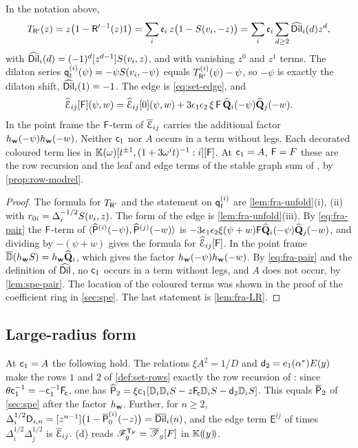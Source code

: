 \begin{thm}[Dictionary]
\label{thm:fra-dict}
In the notation above,
\[
T_{\mathsf{R}'}(z)=z\big(1-\mathsf{R}'^{-1}(z)1\big)=\sum_i\mathfrak{e}_i\,z\big(1-S(v_i,-z)\big)=\sum_i\mathfrak{e}_i\sum_{d\geq2}\widehat{\mathsf{Dil}}_i(d)z^d,
\]
with $\widehat{\mathsf{Dil}}_i(d)=(-1)^d[z^{d-1}]S(v_i,z)$, and with vanishing $z^0$ and $z^1$ terms. The dilaton series $\mathsf{q}_{t}^{(i)}(\psi)=-\psi S(v_i,-\psi)$ equals $T_{\mathsf{R}'}^{(i)}(\psi)-\psi$, so $-\psi$ is exactly the dilaton shift, $\widehat{\mathsf{Dil}}_i(1)=-1$. The edge is \eqref{eq:set-edge}, and
\[
\widehat{\mathcal{E}}_{ij}[\mathsf{F}](\psi,w)=\widehat{\mathcal{E}}_{ij}[0](\psi,w)+3\epsilon_1\epsilon_2\,\xi\,\mathsf{F}\,\widehat{\mathbf{Q}}_i(-\psi)\widehat{\mathbf{Q}}_j(-w).
\]
In the point frame the $\mathsf{F}$-term of $\overline{\mathcal{E}}_{ij}$ carries the additional factor $h_{\mathbf{w}}(-\psi)h_{\mathbf{w}}(-w)$. Neither $\mathsf{c}_{1}$ nor $A$ occurs in a term without legs. Each decorated coloured term lies in $\mathbb{K}(\omega)[t^{\pm1},(1+3\omega^it)^{-1}:i][\mathsf{F}]$. At $\mathsf{c}_{1}=A$, $\mathsf{F}=F$ these are the row recursion and the leaf and edge terms of the stable graph sum of \cite{BS}, by \cref{prop:row-modrel}.
\end{thm}

\begin{proof}
The formula for $T_{\mathsf{R}'}$ and the statement on $\mathsf{q}_{t}^{(i)}$ are \cref{lem:fra-unfold}(i), (ii) with $r_{0i}=\Delta_i^{-1/2}S(v_i,z)$. The form of the edge is \cref{lem:fra-unfold}(iii). By \eqref{eq:fra-pair} the $\mathsf{F}$-term of $\langle\widehat{\mathsf{P}}^{(i)}(-\psi),\widehat{\mathsf{P}}^{(j)}(-w)\rangle$ is $-3\epsilon_1\epsilon_2\xi(\psi+w)\mathsf{F}\widehat{\mathbf{Q}}_i(-\psi)\widehat{\mathbf{Q}}_j(-w)$, and dividing by $-(\psi+w)$ gives the formula for $\widehat{\mathcal{E}}_{ij}[\mathsf{F}]$. In the point frame $\overline{\mathbb{D}}(h_{\mathbf{w}}S)=h_{\mathbf{w}}\widehat{\mathbf{Q}}_i$, which gives the factor $h_{\mathbf{w}}(-\psi)h_{\mathbf{w}}(-w)$. By \eqref{eq:fra-pair} and the definition of $\widehat{\mathsf{Dil}}$, no $\mathsf{c}_{1}$ occurs in a term without legs, and $A$ does not occur, by \cref{lem:spe-pair}. The location of the coloured terms was shown in the proof of the coefficient ring in \cref{sec:spe}. The last statement is \cref{lem:fra-LR}.
\end{proof}

\subsection{Large-radius form}

\begin{lem}
\label{lem:fra-LR}
At $\mathsf{c}_{1}=A$ the following hold. The relations $\xi A^2=1/D$ and $\mathsf{d}_{2}=e_1(\alpha^*)E(y)$ make the rows $1$ and $2$ of \cref{def:set-rows} exactly the row recursion of \cite{BS}: since $\theta\mathsf{c}_{1}^{-1}=-\mathsf{c}_{1}^{-1}\mathsf{F}_{\!\mathsf{c}}$, one has $\widehat{\mathsf{P}}_2=\xi\mathsf{c}_{1}[\mathbb{D}_i\mathbb{D}_iS-z\mathsf{F}_{\!\mathsf{c}}\mathbb{D}_iS-\mathsf{d}_{2}\mathbb{D}_iS]$. This equals $\overline{\mathsf{P}}_2$ of \cref{sec:spe} after the factor $h_{\mathbf{w}}$. Further, for $n\geq2$, $\Delta_i^{1/2}\mathsf{D}_{i,n}=[z^{n-1}]\big(1-\overline{\mathsf{P}}_0^{(i)}(-z)\big)=\overline{\mathsf{Dil}}_i(n)$, and the edge term $\mathsf{E}^{ij}$ of \cite{BS} times $\Delta_i^{1/2}\Delta_j^{1/2}$ is $\overline{\mathcal{E}}_{ij}$. \textup{(d)} reads $\mathscr{F}_g^{\mathsf{T}_{\mathrm{F}}}=\overline{\mathscr{T}}_g[F]$ in $\mathbb{K}(\!(y)\!)$.
\end{lem}

